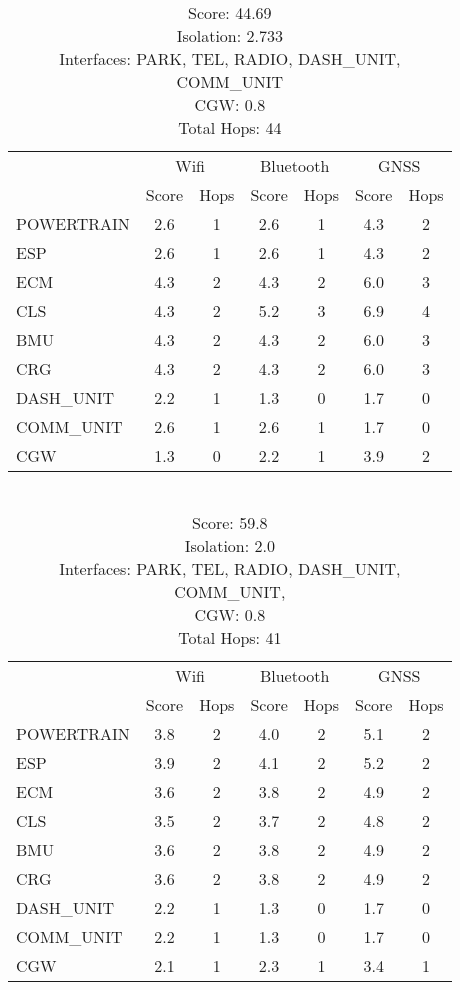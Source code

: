 \begin{table}[ht]
    \centering
    \caption{ \\ Score: 44.69 \\ Isolation: 2.733 \\ Interfaces: PARK, TEL, RADIO, DASH\_UNIT, COMM\_UNIT \\ CGW: 0.8 \\ Total Hops: 44}
    \label{tab:arch5}
    \begin{tabular}{lcccccc}
    \hline
        & \multicolumn{2}{c}{Wifi} & \multicolumn{2}{c}{Bluetooth} & \multicolumn{2}{c}{GNSS} \\
        & Score & Hops & Score & Hops & Score & Hops \\
    \hline
    POWERTRAIN & 2.6 & 1 & 2.6 & 1 & 4.3 & 2 \\
    ESP & 2.6 & 1 & 2.6 & 1 & 4.3 & 2 \\
    ECM & 4.3 & 2 & 4.3 & 2 & 6.0 & 3 \\
    CLS & 4.3 & 2 & 5.2 & 3 & 6.9 & 4 \\
    BMU & 4.3 & 2 & 4.3 & 2 & 6.0 & 3 \\
    CRG & 4.3 & 2 & 4.3 & 2 & 6.0 & 3 \\
    DASH\_UNIT & 2.2 & 1 & 1.3 & 0 & 1.7 & 0 \\
    COMM\_UNIT & 2.6 & 1 & 2.6 & 1 & 1.7 & 0 \\
    CGW & 1.3 & 0 & 2.2 & 1 & 3.9 & 2 \\
    \hline
    \end{tabular}
\end{table}   


\begin{table}[ht]
    \centering
    \caption{ \\ Score: 59.8 \\ Isolation: 2.0 \\ Interfaces: PARK, TEL, RADIO, DASH\_UNIT, COMM\_UNIT, \\ CGW: 0.8 \\ Total Hops: 41}
    \label{tab:arch6}
    \begin{tabular}{lcccccc}
    \hline
        & \multicolumn{2}{c}{Wifi} & \multicolumn{2}{c}{Bluetooth} & \multicolumn{2}{c}{GNSS} \\
        & Score & Hops & Score & Hops & Score & Hops \\
    \hline
    POWERTRAIN & 3.8 & 2 & 4.0 & 2 & 5.1 & 2 \\
    ESP & 3.9 & 2 & 4.1 & 2 & 5.2 & 2 \\
    ECM & 3.6 & 2 & 3.8 & 2 & 4.9 & 2 \\
    CLS & 3.5 & 2 & 3.7 & 2 & 4.8 & 2 \\
    BMU & 3.6 & 2 & 3.8 & 2 & 4.9 & 2 \\
    CRG & 3.6 & 2 & 3.8 & 2 & 4.9 & 2 \\
    DASH\_UNIT & 2.2 & 1 & 1.3 & 0 & 1.7 & 0 \\
    COMM\_UNIT & 2.2 & 1 & 1.3 & 0 & 1.7 & 0 \\
    CGW & 2.1 & 1 & 2.3 & 1 & 3.4 & 1 \\
    \hline
    \end{tabular}
\end{table}   

